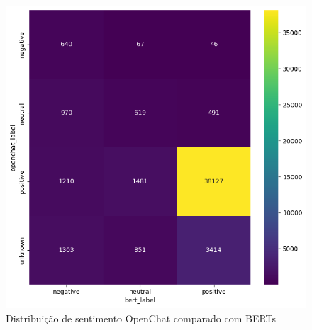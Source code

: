 \begin{figure}
	\centering
	\includegraphics[width=.8\textwidth]{figs/openchat/heat_vs_bert.png}
	\caption{Distribuição de sentimento OpenChat comparado com BERTs}
	\label{img:heat_openchat_vs_bert}
\end{figure}



